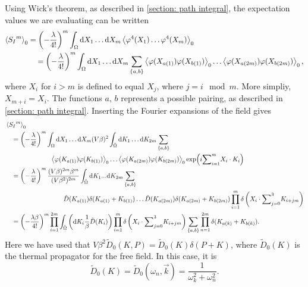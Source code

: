 Using Wick's theorem, as described in \autoref{section: path integral}, the expectation values we are evaluating can be written
\begin{align*}
    \left\langle {S_I}^m \right\rangle_0 & 
    = \left(- \frac{\lambda }{4!}\right)^m 
    \int_{\Omega} \dd X_1 \dots \dd X_m
    \left\langle \varphi^4(X_1) \dots \varphi^4(X_m) \right\rangle_0 \\ 
    & \quad
    = \left(- \frac{\lambda }{4!}\right)^m 
    \int_{\Omega} \dd X_1 \dots \dd X_m \sum_{\{a, b\}}
    \left\langle \varphi(X_{a(1)}) \varphi(X_{b(1)}) \right\rangle_0
    \dots
    \left\langle \varphi(X_{a(2m)}) \varphi(X_{b(2m)}) \right\rangle_0,
\end{align*}
%
where $X_i$ for $i>m$ is defined to equal $X_j$, where $j = i \mod m$.
More simpliy,  $X_{m + i} = X_i$.
The functions $a,\,b$ represents a possible pairing, as described in \autoref{section: path integral}.
Inserting the Fourier expansions of the field gives
\begin{align*}
    & \left\langle {S_I}^m \right\rangle_0 \\
    &\quad 
    = \left(-\frac{\lambda }{4!}\right)^m 
    \int_{\Omega} \dd X_1 \dots \dd X_m
    (V \beta)^2 \int_{\tilde \Omega} \dd K_1 \dots \dd K_{2m} \sum_{\{a, b\}} \\
    & \quad \quad \quad \quad\quad \quad \quad
    \left\langle \varphi(K_{a(1)}) \varphi(K_{b(1)}) \right\rangle_0
    \dots
    \left\langle \varphi(K_{a(2m)}) \varphi(K_{b(2m)}) \right\rangle_0     
    \exp(i {\sum}_{i=1}^{m} X_i \cdot K_i)\\ 
    & \quad  
    = \left(-\frac{\lambda }{4!}\right)^m 
    \frac{(V \beta)^{2m} \beta^m}{(V \beta^2)^{2m}}
    \int_{\tilde \Omega} \dd K_1 ... \dd K_{2m} \sum_{\{a, b\}} \\
    & \quad \quad \quad \quad \quad \quad \quad \quad \quad
    \tilde D(K_{a(1)}) \delta(K_{a(1)} + K_{b(1)}) \dots 
    \tilde D(K_{a(2m)}) \delta(K_{a(2m)} + K_{b(2m)})
    \prod_{i=1}^m \delta\left(X_i \cdot {\sum}_{j=0}^3 K_{i + jm}\right) \\
    & \quad 
    = \left(-\frac{\lambda \beta}{4!}\right)^m 
    \prod_{i=1}^{2m} \int_{\tilde \Omega} 
    \left( \dd K_i \frac{1}{\beta} \tilde D(K_i)  \right) 
    \prod_{i=1}^m \delta\left(X_i \cdot {\sum}_{j=0}^3 K_{i + jm}\right)
    \sum_{\{a, b\}} 
    \prod_{n=1}^{2m}\delta(K_{a(k)} + K_{b(k)}).
\end{align*}
%
Here we have used that $V \beta^2 \tilde D_0(K, P) = \tilde D_0(K) \delta(P + K)$, where $\tilde D_0(K)$ is the thermal propagator for the free field.
In this case, it is
\begin{equation}
    \tilde D_0(K) = \tilde D_0(\omega_n, \vec k) = \frac{1}{\omega_k^2 + \omega_n^2}.
\end{equation}
